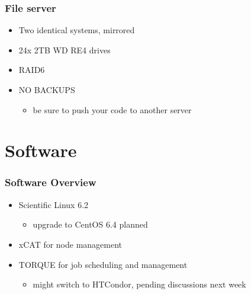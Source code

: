 \begin{frame}\frametitle{File server}

\begin{itemize}
\item
  Two identical systems, mirrored
\item
  24x 2TB WD RE4 drives
\item
  RAID6
\item
  NO BACKUPS

  \begin{itemize}
  \itemsep1pt\parskip0pt
  \item
    be sure to push your code to another server
  \end{itemize}
\end{itemize}

\end{frame}

\section{Software}

\begin{frame}\frametitle{Software Overview}

\begin{itemize}
\itemsep1pt\parskip0pt
\item
  Scientific Linux 6.2

  \begin{itemize}
  \itemsep1pt\parskip0pt
  \item
    upgrade to CentOS 6.4 planned
  \end{itemize}
\item
  xCAT for node management
\item
  TORQUE for job scheduling and management

  \begin{itemize}
  \itemsep1pt\parskip0pt
  \item
    might switch to HTCondor, pending discussions next week
  \end{itemize}
\end{itemize}

\end{frame}

